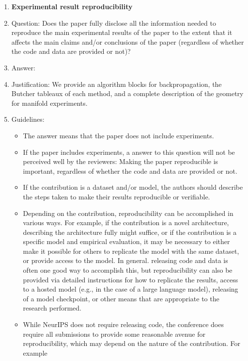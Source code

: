 \begin{enumerate}
    \item {\bf Experimental result reproducibility}
    \item[] Question: Does the paper fully disclose all the information needed to reproduce the main experimental results of the paper to the extent that it affects the main claims and/or conclusions of the paper (regardless of whether the code and data are provided or not)?
    \item[] Answer: \answerYes{} %
    \item[] Justification: We provide an algorithm blocks for backpropagation, the Butcher tableaux of each method, and a complete description of the geometry for manifold experiments.
    \item[] Guidelines:
    \begin{itemize}
        \item The answer \answerNA{} means that the paper does not include experiments.
        \item If the paper includes experiments, a \answerNo{} answer to this question will not be perceived well by the reviewers: Making the paper reproducible is important, regardless of whether the code and data are provided or not.
        \item If the contribution is a dataset and\slash or model, the authors should describe the steps taken to make their results reproducible or verifiable. 
        \item Depending on the contribution, reproducibility can be accomplished in various ways. For example, if the contribution is a novel architecture, describing the architecture fully might suffice, or if the contribution is a specific model and empirical evaluation, it may be necessary to either make it possible for others to replicate the model with the same dataset, or provide access to the model. In general. releasing code and data is often one good way to accomplish this, but reproducibility can also be provided via detailed instructions for how to replicate the results, access to a hosted model (e.g., in the case of a large language model), releasing of a model checkpoint, or other means that are appropriate to the research performed.
        \item While NeurIPS does not require releasing code, the conference does require all submissions to provide some reasonable avenue for reproducibility, which may depend on the nature of the contribution. For example
        \begin{enumerate}

\end{enumerate}
\end{itemize}
\end{enumerate}
